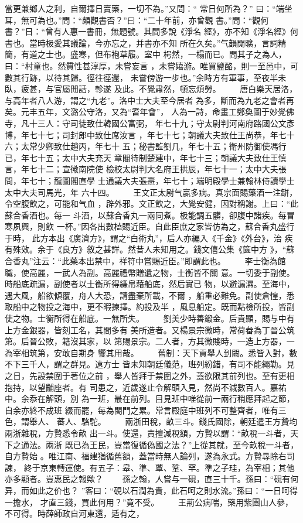\documentclass{ctexart}
\begin{document}
當更兼鄉人之利，自爾擇日賣藥，一切不為。''又問：`` 常日何所為？'' 曰：``端坐耳，無可為也。''問：``頗觀書否？''曰：``二十年前，亦曾觀 書。''問：``觀何書？''日：``曾有人惠一書冊，無題號。其間多說《淨名 經》，亦不知《淨名經》何書也。當時极愛其議論，今亦忘之，并書亦不知 所在久矣。''气韻閒曠，言詞精簡，有道之士也。盛寒，但布袍草履。室中 枵然，一榻而已。問其子之為人，曰：``村童也。然質性甚淳厚，未嘗妄言 ，未嘗嬉游。唯買鹽酪，則一至邑中，可數其行跡，以待其歸。徑往徑還， 未嘗傍游一步也。''余時方有軍事，至夜半未臥，疲甚，与官屬閒話，軫遂 及此。不覺肅然，頓忘煩勞。 　　唐白樂天居洛，与高年者八人游，謂之``九老''。洛中士大夫至今居者 為多，斷而為九老之會者再矣。元丰五年，文潞公守洛，又為``耆年會''， 人為一詩，命畫工鄭奐圖于妙覺佛寺，凡十三人：守司徒致仕韓國公富弼， 年七十九；守太尉判河南府路國公文彥博，年七十七；司封郎中致仕席汝言 ，年七十七；朝議大夫致仕王尚恭，年七十六；太常少卿致仕趙丙，年七十 五；秘書監劉几，年七十五；衛州防御使馮行已，年七十五；太中大夫充天 章閣待制楚建中，年七十三；朝議大夫致仕王慎言，年七十二；宣徽南院使 檢校太尉判大名府王拱辰，年七十一；太中大夫張問，年七十；龍圖閣直學 士通議大夫張燾，年七十；端明殿學士兼翰林侍讀學士太中大夫司馬光，年 六十四。 　　王文正太尉气贏多病。真宗面賜藥酒一注缾，令空腹飲之，可能和气血 ，辟外邪。文正飲之，大覺安健，因對稱謝。上曰：``此蘇合香酒也。每一 斗酒，以蘇合香丸一兩同煮。极能調五髒，卻腹中諸疾。每冒寒夙興，則飲 一杯。''因各出數榼賜近臣。自此臣庶之家皆仿為之，蘇合香丸盛行于時， 此方本出《廣濟方》，謂之``白術丸''，后人亦編入《千金》《外台》，治 疾有殊效。余于《良方》敘之甚詳。然昔人未知用之。錢文僖公集《篋中方 》，``蘇合香丸''注云：``此藥本出禁中，祥符中嘗賜近臣。''即謂此也。 　　李士衡為館職，使高麗，一武人為副。高麗禮幣贈遺之物，士衡皆不關 意。一切委于副使。時船底疏漏，副使者以士衡所得縑帛藉船底，然后實已 物，以避漏濕。至海中，遇大風，船欲傾覆，舟人大恐，請盡棄所載，不爾 ，船重必難免。副使倉惶，悉取船中之物投之海中，更不暇揀擇。約投及半 ，風息船定。既而點檢所投，皆副使之物。士衡所得在船底。一無所失。 　　劉美少時善鍛金。后貴顯，賜与中有上方金銀器，皆刻工名，其間多有 美所造者。又楊景宗微時，常荷畚為丁晉公筑第。后晉公敗，籍沒其家，以 第賜景宗。二人者，方其微賤時，一造上方器，一為宰相筑第，安敢自期身 饗其用哉。 　　舊制：天下貢舉人到闕。悉皆入對，數不下三千人，謂之群見。遠方士 皆未知朝廷儀范，班列紛錯，有司不能繩勒。見之日，先設禁圍于著位之前 ，舉人皆拜于禁圍之外，蓋欲限其前列也。至有更相抱持，以望黼座者。有 司患之，近歲遂止令解頭入見，然尚不減數百人。嘉祐中。余忝在解頭，別 為一班，最在前列。目見班中唯從前一兩行稍應拜起之節，自余亦終不成班 綴而罷，每為閤門之累。常言殿庭中班列不可整齊者，唯有三色，謂舉人、 蕃人、駱駝。 　　兩浙田稅，畝三斗。錢氏國除，朝廷遣王方贄均兩浙雜稅，方贄悉令畝 出一斗。使還，責擅減稅額，方贄以謂：``畝稅一斗者，天下之通法。兩浙 既已為王民，豈當復循偽國之法？''上從其就，至今畝稅一斗者，自方贄始 。唯江南、福建猶循舊額，蓋當時無人論列，遂為永式。方贄尋除右司諫， 終于京東轉運使。有五子：皋、準、覃、鞏、罕。準之子珪，為宰相；其他 亦多顯者。豈惠民之報歟？ 　　孫之翰，人嘗与一硯，直三十千。孫曰：``硯有何异，而如此之价也？ ''客曰：``硯以石潤為貴，此石呵之則水流。''孫曰：``一日呵得一擔水， 才直三錢，買此何用？''竟不受。 　　王荊公病喘，藥用紫團山人參，不可得。時薛師政自河東還，适有之， 
\end{document}
